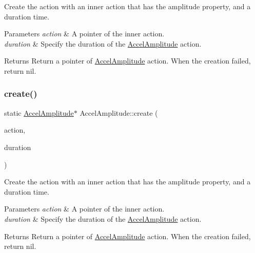 Create the action with an inner action that has the amplitude property, and a duration time. 


\begin{DoxyParams}{Parameters}
{\em action} & A pointer of the inner action. \\
\hline
{\em duration} & Specify the duration of the \hyperlink{classAccelAmplitude}{Accel\+Amplitude} action. \\
\hline
\end{DoxyParams}
\begin{DoxyReturn}{Returns}
Return a pointer of \hyperlink{classAccelAmplitude}{Accel\+Amplitude} action. When the creation failed, return nil. 
\end{DoxyReturn}
\mbox{\label{classAccelAmplitude_adc7d898bc8e0c3a88b60b2c40af5b403}} 
\subsubsection{\texorpdfstring{create()}{create()}\hspace{0.1cm}{\footnotesize\ttfamily [2/2]}}
{\footnotesize\ttfamily static \hyperlink{classAccelAmplitude}{Accel\+Amplitude}$\ast$ Accel\+Amplitude\+::create (\begin{DoxyParamCaption}\item[{\hyperlink{classAction}{Action} $\ast$}]{action,  }\item[{float}]{duration }\end{DoxyParamCaption})\hspace{0.3cm}{\ttfamily [static]}}



Create the action with an inner action that has the amplitude property, and a duration time. 


\begin{DoxyParams}{Parameters}
{\em action} & A pointer of the inner action. \\
\hline
{\em duration} & Specify the duration of the \hyperlink{classAccelAmplitude}{Accel\+Amplitude} action. \\
\hline
\end{DoxyParams}
\begin{DoxyReturn}{Returns}
Return a pointer of \hyperlink{classAccelAmplitude}{Accel\+Amplitude} action. When the creation failed, return nil. 
\end{DoxyReturn}
\mbox{\label{classAccelAmplitude_a890ef366cbe8aeb077fb6b3a2c3324b0}} 
